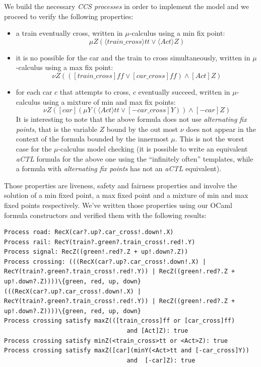 We build the necessary \emph{CCS processes} in order to implement the
model and we proceed to verify the following properties:
\begin{itemize}
\item a train eventually cross, written in $\mu$-calculus using a min
  fix point:
  \begin{displaymath}
    \mu Z(\langle train\_cross\rangle tt \vee \langle Act
    \rangle Z)
  \end{displaymath}
\item it is no possible for the car and the train to cross
  simultaneously, written in $\mu$-calculus using a max fix point:
  \begin{displaymath}
    \nu Z(([train\_cross]ff \vee [car\_cross]ff) \wedge [Act]Z)
  \end{displaymath}
\item for each car $c$ that attempts to cross, $c$ eventually succeed,
  written in $\mu$-calculus using a mixture of min and max fix points:
  \begin{displaymath}
    \nu Z([car](\mu Y(\langle Act \rangle tt \vee [-car\_cross]Y))
    \wedge  [-car]Z)
  \end{displaymath}
  It is interesting to note that the above formula does not use
  \emph{alternating fix points}, that is the variable $Z$ bound by the
  out most $\nu$ does not appear in the context of the formula bounded
  by the innermost $\mu$. This is not the worst case for the
  $\mu$-calculus model checking (it is possible to write an equivalent
  \emph{aCTL} formula for the above one using the ``infinitely often''
  templates, while a formula with \emph{alternating fix points} has
  not an \emph{aCTL} equivalent).
\end{itemize}
Those properties are liveness, safety and fairness properties and
involve the solution of a min fixed point, a max fixed point and a
mixture of min and max fixed points respectively. We've written those
properties using our OCaml formula constructors and verified them with
the following results:
\begin{verbatim}
Process road: RecX(car?.up?.car_cross!.down!.X)
Process rail: RecY(train?.green?.train_cross!.red!.Y)
Process signal: RecZ((green!.red?.Z + up!.down?.Z))
Process crossing: (((RecX(car?.up?.car_cross!.down!.X) |
RecY(train?.green?.train_cross!.red!.Y)) | RecZ((green!.red?.Z +
up!.down?.Z))))\{green, red, up, down}
(((RecX(car?.up?.car_cross!.down!.X) |
RecY(train?.green?.train_cross!.red!.Y)) | RecZ((green!.red?.Z +
up!.down?.Z))))\{green, red, up, down}
Process crossing satisfy maxZ(([train_cross]ff or [car_cross]ff)
                                  and [Act]Z): true
Process crossing satisfy minZ(<train_cross>tt or <Act>Z): true
Process crossing satisfy maxZ([car](minY(<Act>tt and [-car_cross]Y))
                                  and  [-car]Z): true
\end{verbatim}

